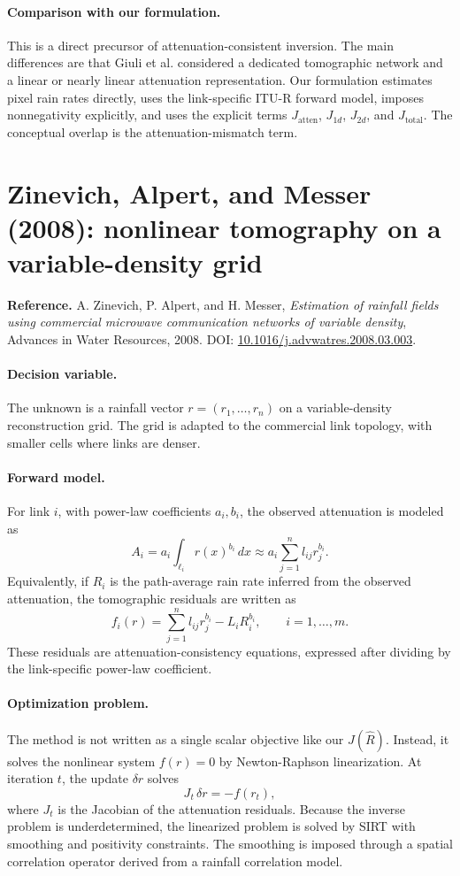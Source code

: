 \documentclass[11pt]{article}
\newcommand{\Rhat}{\hat{R}}
\newcommand{\Jatten}{J_{\mathrm{atten}}}
\begin{document}
\paragraph{Comparison with our formulation.}
This is a direct precursor of attenuation-consistent inversion.
The main differences are that Giuli et al. considered a dedicated tomographic network and a linear or nearly linear attenuation representation.
Our formulation estimates pixel rain rates directly, uses the link-specific ITU-R forward model, imposes nonnegativity explicitly, and uses the explicit terms $\Jatten$, $J_{1d}$, $J_{2d}$, and $J_{\mathrm{total}}$.
The conceptual overlap is the attenuation-mismatch term.

\section{Zinevich, Alpert, and Messer (2008): nonlinear tomography on a variable-density grid}
\textbf{Reference.}
A. Zinevich, P. Alpert, and H. Messer,
\emph{Estimation of rainfall fields using commercial microwave communication networks of variable density},
Advances in Water Resources, 2008.
DOI: \href{https://doi.org/10.1016/j.advwatres.2008.03.003}{10.1016/j.advwatres.2008.03.003}.

\paragraph{Decision variable.}
The unknown is a rainfall vector $r=(r_1,
\ldots,r_n)$ on a variable-density reconstruction grid.
The grid is adapted to the commercial link topology, with smaller cells where links are denser.

\paragraph{Forward model.}
For link $i$, with power-law coefficients $a_i,b_i$, the observed attenuation is modeled as
\[
  A_i
  =
  a_i\int_{\ell_i} r(x)^{b_i}\,dx
  \approx
  a_i\sum_{j=1}^n l_{ij}r_j^{b_i} .
\]
Equivalently, if $R_i$ is the path-average rain rate inferred from the observed attenuation, the tomographic residuals are written as
\[
  f_i(r)=\sum_{j=1}^n l_{ij}r_j^{b_i}-L_iR_i^{b_i},
  \qquad i=1,\ldots,m .
\]
These residuals are attenuation-consistency equations, expressed after dividing by the link-specific power-law coefficient.

\paragraph{Optimization problem.}
The method is not written as a single scalar objective like our $J(\Rhat)$.
Instead, it solves the nonlinear system $f(r)=0$ by Newton-Raphson linearization.
At iteration $t$, the update $\delta r$ solves
\[
  J_t\,\delta r = -f(r_t),
\]
where $J_t$ is the Jacobian of the attenuation residuals.
Because the inverse problem is underdetermined, the linearized problem is solved by SIRT with smoothing and positivity constraints.
The smoothing is imposed through a spatial correlation operator derived from a rainfall correlation model.
\end{document}

